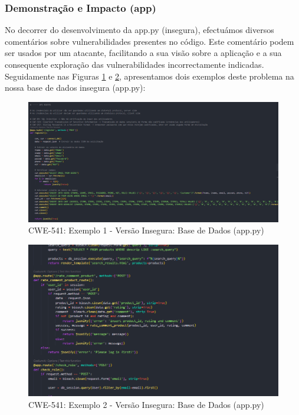 \subsubsection{Demonstração e Impacto (app)}
No decorrer do desenvolvimento da app.py (insegura), efectuámos diversos comentários sobre vulnerabilidades presentes no código. Este comentário podem ser usados por um atacante, facilitando a sua visão sobre a aplicação e a sua consequente exploração das vulnerabilidades incorrectamente indicadas. Seguidamente nas Figuras \ref{fig:cwe541-ex1} e \ref{fig:cwe541-ex2}, apresentamos dois exemplos deste problema na nossa base de dados insegura (app.py):

\begin{figure}[H]
  \centering
  \includegraphics[width=16cm]{images/CWE-541-EX1.png}
  \caption{CWE-541: Exemplo 1 - Versão Insegura: Base de Dados (app.py)}
  \label{fig:cwe541-ex1}
\end{figure}

\begin{figure}[H]
  \centering
  \includegraphics[width=16cm]{images/CWE-541-EX2.png}
  \caption{CWE-541: Exemplo 2 - Versão Insegura: Base de Dados (app.py)}
  \label{fig:cwe541-ex2}
\end{figure}

